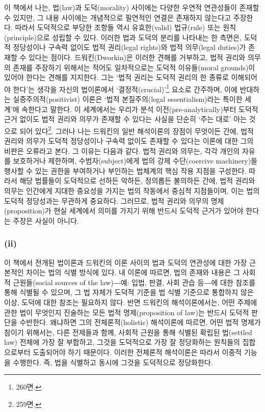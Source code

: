 이 책에서 나는, 법(law)과 도덕(morality) 사이에는 다양한 우연적
연관성들이 존재할 수 있지만, 그 내용 사이에는 개념적으로 필연적인 연결은
존재하지 않는다고 주장한다. 따라서 도덕적으로 부당한 조항들 역시
유효한(valid) 법규(rule) 또는 원칙(principle)으로 성립할 수 있다. 이러한
법과 도덕의 분리를 나타내는 한 측면은, 도덕적 정당성이나 구속력 없이도
법적 권리(legal rights)와 법적 의무(legal duties)가 존재할 수 있다는
점이다. 드워킨(Dworkin)은 이러한 견해를 거부하고, 법적 권리와 의무의
존재를 주장하기 위해서는 적어도 일차적으로는 도덕적 이유들(moral
grounds)이 있어야 한다는 견해를 지지한다. 그는 `법적 권리는 도덕적
권리의 한 종류로 이해되어야 한다'는 생각을 자신의 법이론에서
`결정적(crucial)'\footnote{ 260면.} 요소로 간주하며, 이에
반대하는 실증주의적(positivist) 이론은 `법적 본질주의(legal
essentialism)라는 특이한 세계'에 속한다고 말한다. 이 세계에서는 우리가
분석 이전(pre-analytically)부터 도덕적 근거 없이도 법적 권리와 의무가
존재할 수 있다는 사실을 단순히 `주는 대로' 아는 것으로 되어
있다\footnote{ 259면.}. 그러나 나는 드워킨의 일반 해석이론의
장점이 무엇이든 간에, 법적 권리와 의무가 도덕적 정당성이나 구속력 없이도
존재할 수 있다는 이론에 대한 그의 비판은 오류라고 본다. 그 이유는 다음과
같다. 법적 권리와 의무는, 각각 개인의 자유를 보호하거나 제한하며,
수범자(subject)에게 법의 강제 수단(coercive machinery)을 행사할 수 있는
권한을 부여하거나 부인하는 법체계의 핵심 작용 지점을 구성한다. 따라서
해당 법률들이 도덕적으로 선하든 악하든, 정의롭든 불의하든 간에, 법적
권리와 의무는 인간에게 지대한 중요성을 가지는 법의 작동에서 중심적
지점들이며, 이는 법의 도덕적 정당성과는 무관하게 중요하다. 그러므로,
법적 권리와 의무의 명제(proposition)가 현실 세계에서 의미를 가지기 위해
반드시 도덕적 근거가 있어야 한다는 주장은 사실이 아니다.

\subsubsection{\texorpdfstring{(ii) }{(ii) 법의 식별 (The Identification of the Law)}}\label{ii-uxbc95uxc758-uxc2dduxbcc4-the-identification-of-the-law}

이 책에서 전개된 법이론과 드워킨의 이론 사이의 법과 도덕의 연관성에 대한
가장 근본적인 차이는 법의 식별 방식에 있다. 내 이론에 따르면, 법의
존재와 내용은 그 사회적 근원들(social sources of the law)―예: 입법,
판결, 사회 관습 등―에 대한 참조를 통해 식별될 수 있으며, 그 법 자체가
도덕적 기준을 법 식별 기준으로 통합하지 않은 이상, 도덕에 대한 참조는
필요하지 않다. 반면 드워킨의 해석이론에서는, 어떤 주제에 관한 법이
무엇인지 진술하는 모든 법적 명제(proposition of law)는 반드시 도덕적
판단을 수반한다. 왜냐하면 그의 전체론적(holistic) 해석이론에 따르면,
어떤 법적 명제가 참이기 위해서는, 다른 전제들과 함께, 사회적 근원을 통해
식별된 확립된 법(settled law) 전체에 가장 잘 부합하고, 그것을 도덕적으로
가장 잘 정당화하는 원칙들의 집합으로부터 도출되어야 하기 때문이다.
이러한 전체론적 해석이론은 따라서 이중적 기능을 수행한다. 즉, 법을
식별하고 동시에 그것을 도덕적으로 정당화한다.

